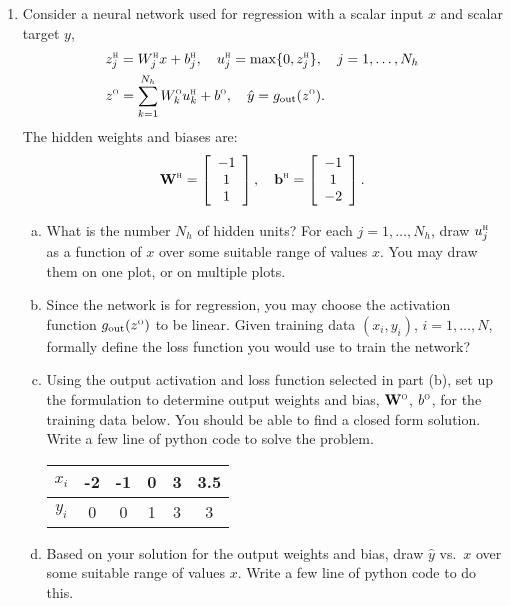 \documentclass[11pt]{article}
\newcommand{\bbf}{\mathbf{b}}
\newcommand{\Wbf}{\mathbf{W}}
\def\hid{\textsc{\tiny H}}
\def\out{\textsc{\tiny O}}
\begin{document}
\begin{enumerate}
\item Consider a neural network used for regression with a scalar input $x$ and
scalar target $y$,
\begin{align*}
    & z_{j}^\hid = W^\hid_{j}x + b^\hid_j, \quad
    u_{j}^\hid = \max\{0, z^\hid_j\},
    \quad j=1,\ldots,N_h \\
    &
    z^\out = \sum_{k=1}^{N_h} W^\out_{k}u^\hid_{k} + b^\out,
    \quad
    \hat{y} = g_{\rm out}(z^\out).
\end{align*}
The hidden weights and biases are:
\[
    \Wbf^\hid = \left[ \begin{array}{c} -1  \\ 1  \\  1 \end{array} \right], \quad
    \bbf^\hid = \left[ \begin{array}{c} -1 \\ 1 \\ -2 \end{array} \right].
\]

\begin{enumerate}[(a)]

\item What is the number $N_h$ of hidden units?  For each $j=1,\ldots,N_h$,
draw $u^\hid_j$ as a function of $x$ over some suitable range of values $x$.
You may draw them on one plot, or on
multiple plots.

\item Since the network is for regression, you may choose
the activation function $g_{\rm out}(z^\out)$ to be linear.
Given training data $(x_i,y_i)$, $i=1,\ldots,N$, formally define the loss function you would use
to train the network?

\item Using the output activation and loss function selected in part (b), set up the formulation to determine
output weights and bias, $\Wbf^\out$, $b^\out$,
for the training data below.  You should be able to find a closed form solution. Write a few line of python code to solve the problem.
\begin{center}
\begin{tabular}{|c|c|c|c|c|c|} \hline
$x_i$ & -2 & -1 & 0 & 3 & 3.5\\ \hline
$y_i$ & 0 & 0   & 1 & 3 & 3 \\ \hline
\end{tabular}
\end{center}

\item
 Based on your solution for the output weights and bias,
draw $\hat{y}$ vs.\ $x$ over some suitable range of values $x$.  Write a few line of python code to do this.




\end{enumerate}
\end{enumerate}
\end{document}
